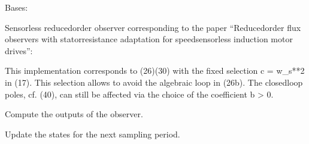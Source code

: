 \documentclass[letterpaper,10pt,english]{sphinxmanual}
\begin{document}
\begin{fulllineitems}
\label{\detokenize{control.im:control.im.vector.SensorlessObserver}}
\pysigstartsignatures
{}
\pysigstopsignatures
\sphinxAtStartPar
Bases: 

\sphinxAtStartPar
Sensorless reduced\sphinxhyphen{}order observer corresponding to the paper
“Reduced\sphinxhyphen{}order flux observers with stator\sphinxhyphen{}resistance adaptation for
speed\sphinxhyphen{}sensorless induction motor drives”:
\begin{quote}

\sphinxAtStartPar
{}
\end{quote}

\sphinxAtStartPar
This implementation corresponds to (26)\sphinxhyphen{}(30) with the fixed selection
c = w\_s**2 in (17). This selection allows to avoid the algebraic loop
in (26b). The closed\sphinxhyphen{}loop poles, cf. (40), can still be affected via the
choice of the coefficient b \textgreater{} 0.

\begin{fulllineitems}
\label{\detokenize{control.im:control.im.vector.SensorlessObserver.output}}
\pysigstartsignatures
{}
\pysigstopsignatures
\sphinxAtStartPar
Compute the outputs of the observer.

\end{fulllineitems}


\begin{fulllineitems}
\label{\detokenize{control.im:control.im.vector.SensorlessObserver.update}}
\pysigstartsignatures
{}
\pysigstopsignatures
\sphinxAtStartPar
Update the states for the next sampling period.

\end{fulllineitems}


\end{fulllineitems}
\end{document}
